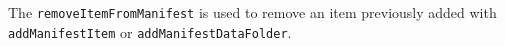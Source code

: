 The \verb+removeItemFromManifest+ is used to remove an item previously added with \verb+addManifestItem+ or \verb+addManifestDataFolder+.
